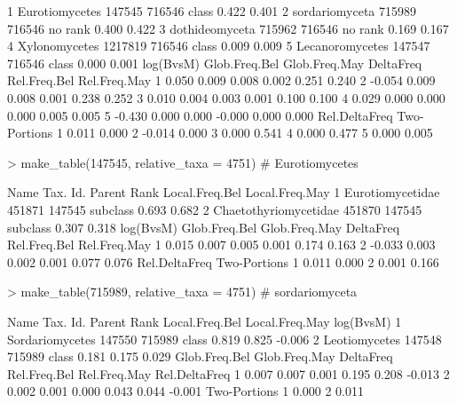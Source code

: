 \documentclass{article}
\begin{document}
\begin{Schunk}
\begin{Soutput}
1  Eurotiomycetes   147545 716546   class          0.422          0.401
2  sordariomyceta   715989 716546 no rank          0.400          0.422
3  dothideomyceta   715962 716546 no rank          0.169          0.167
4   Xylonomycetes  1217819 716546   class          0.009          0.009
5 Lecanoromycetes   147547 716546   class          0.000          0.001
  log(BvsM) Glob.Freq.Bel Glob.Freq.May DeltaFreq Rel.Freq.Bel Rel.Freq.May
1     0.050         0.009         0.008     0.002        0.251        0.240
2    -0.054         0.009         0.008     0.001        0.238        0.252
3     0.010         0.004         0.003     0.001        0.100        0.100
4     0.029         0.000         0.000     0.000        0.005        0.005
5    -0.430         0.000         0.000    -0.000        0.000        0.000
  Rel.DeltaFreq Two-Portions
1         0.011        0.000
2        -0.014        0.000
3         0.000        0.541
4         0.000        0.477
5         0.000        0.005
\end{Soutput}
\begin{Sinput}
> make_table(147545, relative_taxa = 4751) # Eurotiomycetes
\end{Sinput}
\begin{Soutput}
                   Name Tax. Id. Parent     Rank Local.Freq.Bel Local.Freq.May
1      Eurotiomycetidae   451871 147545 subclass          0.693          0.682
2 Chaetothyriomycetidae   451870 147545 subclass          0.307          0.318
  log(BvsM) Glob.Freq.Bel Glob.Freq.May DeltaFreq Rel.Freq.Bel Rel.Freq.May
1     0.015         0.007         0.005     0.001        0.174        0.163
2    -0.033         0.003         0.002     0.001        0.077        0.076
  Rel.DeltaFreq Two-Portions
1         0.011        0.000
2         0.001        0.166
\end{Soutput}
\begin{Sinput}
> make_table(715989, relative_taxa = 4751) # sordariomyceta
\end{Sinput}
\begin{Soutput}
             Name Tax. Id. Parent  Rank Local.Freq.Bel Local.Freq.May log(BvsM)
1 Sordariomycetes   147550 715989 class          0.819          0.825    -0.006
2   Leotiomycetes   147548 715989 class          0.181          0.175     0.029
  Glob.Freq.Bel Glob.Freq.May DeltaFreq Rel.Freq.Bel Rel.Freq.May Rel.DeltaFreq
1         0.007         0.007     0.001        0.195        0.208        -0.013
2         0.002         0.001     0.000        0.043        0.044        -0.001
  Two-Portions
1        0.000
2        0.011
\end{Soutput}
\end{Schunk}
\end{document}
